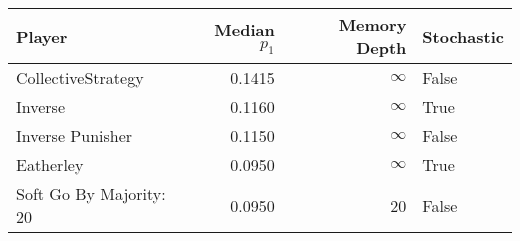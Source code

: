 \begin{tabular}{lrrl}
\toprule
                  Player &  Median $p_1$ &  Memory Depth & Stochastic \\
\midrule
      CollectiveStrategy &        0.1415 &            \(\infty\) &      False \\
                 Inverse &        0.1160 &            \(\infty\) &       True \\
        Inverse Punisher &        0.1150 &            \(\infty\) &      False \\
               Eatherley &        0.0950 &            \(\infty\) &       True \\
 Soft Go By Majority: 20 &        0.0950 &            20 &      False \\
\bottomrule
\end{tabular}
